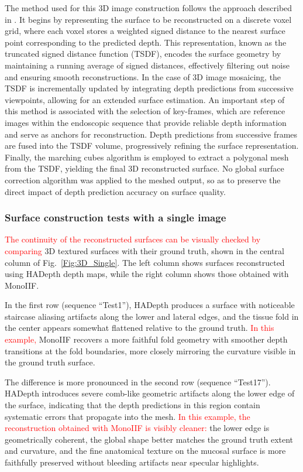 \documentclass[a4paper,fleqn]{cas-dc}
\begin{document}
The method used for this 3D image construction follows the approach described in \citep{Recasens_IEEERAL_2021}. It begins by representing the surface to be reconstructed on a discrete voxel grid, where each voxel stores a weighted signed distance to the nearest surface point corresponding to the predicted depth. This representation, known as the truncated signed distance function (TSDF), encodes the surface geometry by maintaining a running average of signed distances, effectively filtering out noise and ensuring smooth reconstructions. In the case of 3D image mosaicing, the TSDF is incrementally updated by integrating depth predictions from successive viewpoints, allowing for an extended surface estimation. An important step of this 
method is associated with the selection of key-frames, which are reference images within the endoscopic sequence that provide reliable depth information and serve as anchors for reconstruction. Depth predictions from successive frames are fused into the TSDF volume, progressively refining the surface representation. 
Finally, the marching cubes algorithm \citep{Lorensen_SIGGRAPH_1987} is employed to extract a polygonal mesh from the TSDF, yielding the final 3D reconstructed surface. No global surface correction algorithm was applied to the meshed output, so as to preserve the direct impact of depth prediction accuracy on surface quality.

\subsubsection*{Surface construction tests with a single image}
\textcolor{red}{The continuity of the reconstructed surfaces can be visually checked by comparing} 3D textured surfaces with their ground truth, shown in the central column of 
Fig.~\ref{Fig:3D_Single}. The left column shows surfaces reconstructed using HADepth depth maps, while the right column shows those obtained with MonoIIF.

In the first row (sequence ``Test1''), HADepth produces a surface with noticeable staircase aliasing artifacts along the lower and lateral edges, and the tissue fold 
in the center appears somewhat flattened relative to the ground truth. \textcolor{red}{In this example,} MonoIIF recovers a more faithful fold geometry with smoother depth transitions at the fold boundaries, more closely mirroring the curvature visible in the ground truth surface.

The difference is more pronounced in the second row (sequence ``Test17''). HADepth introduces severe comb-like geometric artifacts along the lower edge of the surface, indicating that the depth predictions in this region contain systematic errors that propagate into the mesh. \textcolor{red}{In this example, the reconstruction obtained with MonoIIF is visibly cleaner:} the lower edge is geometrically coherent, the global shape better matches the ground truth extent and curvature, and the fine anatomical texture on the mucosal surface is more faithfully preserved without bleeding artifacts near specular highlights.
\end{document}
